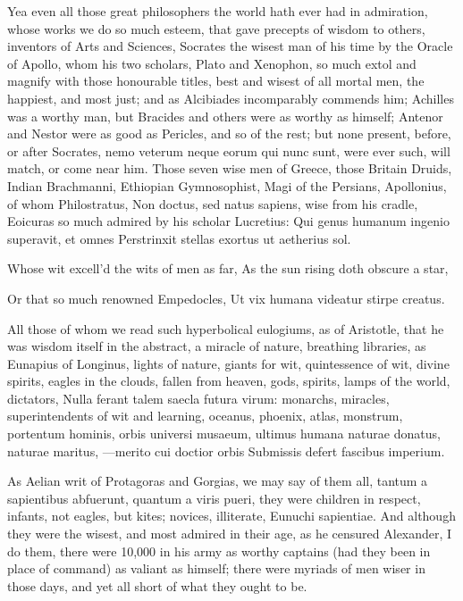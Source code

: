 {Yea even all those great philosophers the world hath ever had in
admiration, whose works we do so much esteem, that gave precepts of
wisdom to others, inventors of Arts and Sciences, Socrates the wisest
man of his time by the Oracle of Apollo, whom his two scholars,
Plato and  Xenophon, so much extol and magnify with those
honourable titles, best and wisest of all mortal men, the happiest, and
most just; and as  Alcibiades incomparably commends him; Achilles
was a worthy man, but Bracides and others were as worthy as himself;
Antenor and Nestor were as good as Pericles, and so of the rest; but
none present, before, or after Socrates, nemo veterum neque eorum qui
nunc sunt, were ever such, will match, or come near him. Those seven
wise men of Greece, those Britain Druids, Indian Brachmanni, Ethiopian
Gymnosophist, Magi of the Persians, Apollonius, of whom Philostratus,
Non doctus, sed natus sapiens, wise from his cradle, Eoicuras so much
admired by his scholar Lucretius:
Qui genus humanum ingenio superavit, et omnes
Perstrinxit stellas exortus ut aetherius sol.

Whose wit excell'd the wits of men as far,
As the sun rising doth obscure a star,

Or that so much renowned Empedocles,
Ut vix humana videatur stirpe creatus.

All those of whom we read such hyperbolical eulogiums, as of
Aristotle, that he was wisdom itself in the abstract, a miracle of
nature, breathing libraries, as Eunapius of Longinus, lights of nature,
giants for wit, quintessence of wit, divine spirits, eagles in the
clouds, fallen from heaven, gods, spirits, lamps of the world,
dictators, Nulla ferant talem saecla futura virum: monarchs, miracles,
superintendents of wit and learning, oceanus, phoenix, atlas, monstrum,
portentum hominis, orbis universi musaeum, ultimus humana naturae
donatus, naturae maritus,
---merito cui doctior orbis
Submissis defert fascibus imperium.

As Aelian writ of Protagoras and Gorgias, we may say of them all,
tantum a sapientibus abfuerunt, quantum a viris pueri, they were
children in respect, infants, not eagles, but kites; novices,
illiterate, Eunuchi sapientiae. And although they were the wisest, and
most admired in their age, as he censured Alexander, I do them, there
were 10,000 in his army as worthy captains (had they been in place of
command) as valiant as himself; there were myriads of men wiser in
those days, and yet all short of what they ought to be.

}

